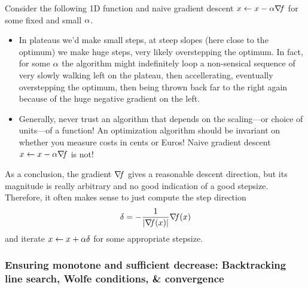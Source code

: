 Consider the following 1D function and naive gradient descent $x \gets
x - \alpha {\nabla_{\!\!}} f$ for some fixed and small $\alpha$.



\begin{itemize}
\item In plateaus we'd make small steps, at steep slopes (here close
to the optimum) we make huge steps, very likely overstepping the
optimum. In fact, for some $\alpha$ the algorithm might indefinitely loop
a non-sensical sequence of very slowly walking left on the plateau,
then accellerating, eventually overstepping the optimum, then being
thrown back far to the right again because of the huge negative
gradient on the left.

\item Generally, never trust an algorithm that depends on the
scaling---or choice of units---of a function! An optimization
algorithm should be invariant on whether you measure costs in cents or
Euros! Naive gradient descent $x \gets x - \alpha {\nabla_{\!\!}} f$ is not!
\end{itemize}

As a conclusion, the gradient ${\nabla_{\!\!}} f$ gives a reasonable descent
direction, but its magnitude is really arbitrary and no good
indication of a good stepsize. Therefore, it often makes sense to just
compute the step direction
\begin{equation}
\delta = - \frac{1}{|{\nabla_{\!\!}} f(x)|} {\nabla_{\!\!}} f(x)
\end{equation}
and iterate $x \gets x + \alpha {\delta}$ for some appropriate stepsize.


\subsubsection{Ensuring monotone and sufficient decrease: Backtracking
line search, Wolfe conditions, \& convergence}

